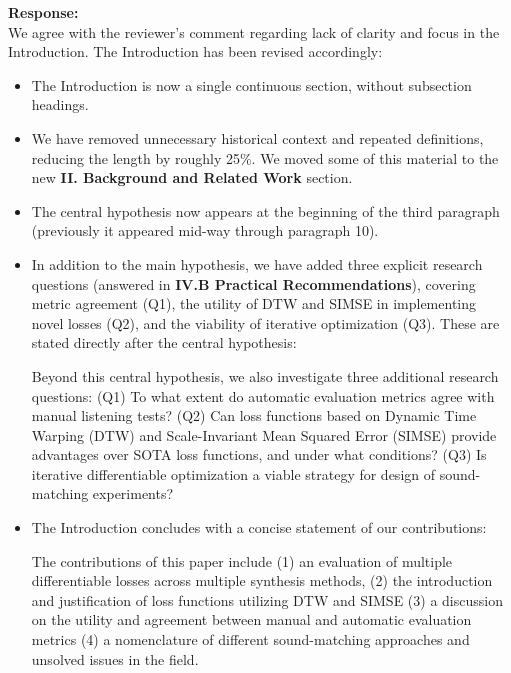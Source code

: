 \documentclass[11pt]{article}
\begin{document}
\noindent\textbf{Response:} \\
We agree with the reviewer’s comment regarding lack of clarity and focus in the Introduction. The Introduction has been revised accordingly: 
\begin{itemize}
  \item The Introduction is now a single continuous section, without subsection headings.  
  \item We have removed unnecessary historical context and repeated definitions, reducing the length by roughly 25\%. We moved some of this material to the new \textbf{II. Background and Related Work} section.  
  \item The central hypothesis now appears at the beginning of the third paragraph (previously it appeared mid-way through paragraph 10).  
  \item In addition to the main hypothesis, we have added three explicit research questions  (answered in \textbf{IV.B Practical Recommendations}), covering metric agreement (Q1), the utility of DTW and SIMSE in implementing novel losses (Q2), and the viability of iterative optimization (Q3). These are stated directly after the central hypothesis:

  \begin{displayquote}
     Beyond this central hypothesis, we also investigate three additional research questions: (Q1) To what extent do automatic evaluation metrics agree with manual listening tests? (Q2) Can loss functions based on Dynamic Time Warping (DTW) and Scale-Invariant Mean Squared Error (SIMSE) provide advantages over SOTA loss functions, and under what conditions?
    (Q3) Is iterative differentiable optimization a viable strategy for design of sound-matching experiments?
\end{displayquote}

  \item The Introduction concludes with a concise statement of our contributions:

  \begin{displayquote}
      The contributions of this paper include (1) an evaluation of multiple differentiable losses across multiple synthesis methods, (2) the introduction and justification of loss functions utilizing DTW and SIMSE (3) a discussion on the utility and agreement between manual and automatic evaluation metrics (4) a nomenclature of different sound-matching approaches and unsolved issues in the field. 
  \end{displayquote}
\end{itemize}
\end{document}
